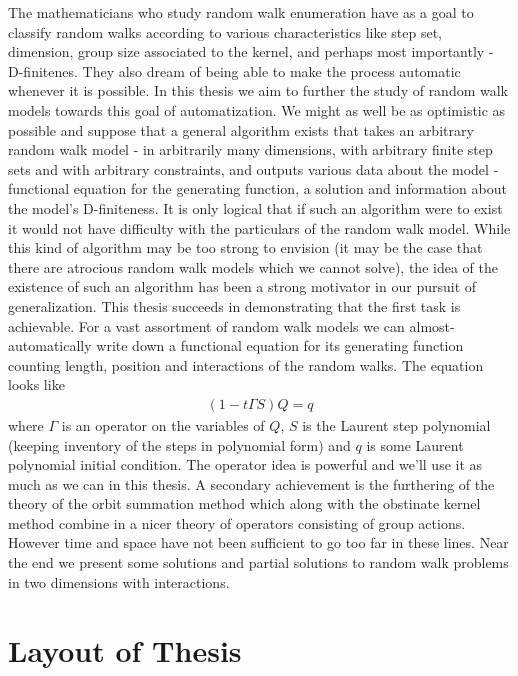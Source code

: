 The mathematicians who study random walk enumeration have as a goal to classify random walks according to various characteristics like step set, dimension, group size associated to the kernel, and perhaps most importantly - D-finitenes. They also dream of being able to make the process automatic whenever it is possible. In this thesis we aim to further the study of random walk models towards this goal of automatization. We might as well be as optimistic as possible and suppose that a general algorithm exists that takes an arbitrary random walk model - in arbitrarily many dimensions, with arbitrary finite step sets and with arbitrary constraints, and outputs various data about the model - functional equation for the generating function, a solution and information about the model's D-finiteness. It is only logical that if such an algorithm were to exist it would not have difficulty with the particulars of the random walk model. While this kind of algorithm may be too strong to envision (it may be the case that there are atrocious random walk models which we cannot solve), the idea of the existence of such an algorithm has been a strong motivator in our pursuit of generalization. This thesis succeeds in demonstrating that the first task is achievable. For a vast assortment of random walk models we can almost-automatically write down a functional equation for its generating function counting length, position and interactions of the random walks. The equation looks like
\begin{align}
	(1- t\Gamma S) Q = q
\end{align}
where $\Gamma$ is an operator on the variables of $Q$, $S$ is the Laurent step polynomial (keeping inventory of the steps in polynomial form) and $q$ is some Laurent polynomial initial condition. The operator idea is powerful and we'll use it as much as we can in this thesis. A secondary achievement is the furthering of the theory of the orbit summation method which along with the obstinate kernel method combine in a nicer theory of operators consisting of group actions. However time and space have not been sufficient to go too far in these lines. Near the end we present some solutions and partial solutions to random walk problems in two dimensions with interactions. 

\section{Layout of Thesis}

